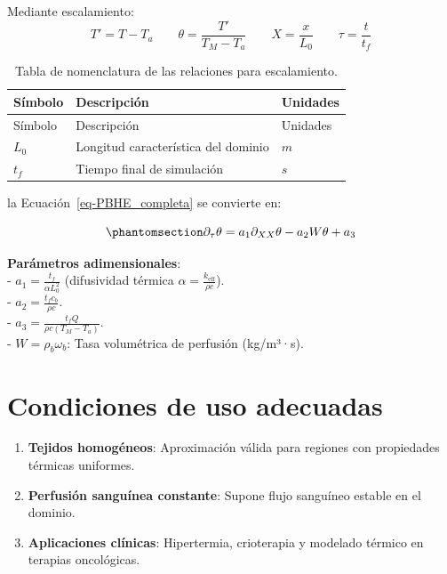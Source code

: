 \documentclass[
  spanish,
  us-letterpaper,
  DIV=11,
  numbers=noendperiod]{scrreprt}
\providecommand{\tightlist}{%
  \setlength{\itemsep}{0pt}\setlength{\parskip}{0pt}}
\theoremstyle{definition}
\theoremstyle{plain}
\theoremstyle{remark}
\begin{document}
Mediante escalamiento: \begin{equation*}
T' = T - T_a \qquad \theta = \dfrac{T'}{T_M - T_a} \qquad X = \dfrac{x}{L_0} \qquad \tau = \dfrac{t}{t_f}
\end{equation*}

\begin{longtable}[]{@{}lll@{}}
\caption{Tabla de nomenclatura de las relaciones para
escalamiento.}\label{tbl-}\tabularnewline
\toprule\noalign{}
Símbolo & Descripción & Unidades \\
\midrule\noalign{}
\endfirsthead
\toprule\noalign{}
Símbolo & Descripción & Unidades \\
\midrule\noalign{}
\endhead
\bottomrule\noalign{}
\endlastfoot
\(L_0\) & Longitud característica del dominio & \(m\) \\
\(t_f\) & Tiempo final de simulación & \(s\) \\
\end{longtable}

la Ecuación~\ref{eq-PBHE_completa} se convierte en:

\begin{equation}\phantomsection\label{eq-PBHE-reduced}{
\partial_{\tau} \theta = a_1 \partial_{XX} \theta - a_2 W \theta + a_3
}\end{equation}

\textbf{Parámetros adimensionales}:\\
- \(a_1 = \frac{t_f}{\alpha L_0^2}\) (difusividad térmica
\(\alpha = \frac{k_{\text{eff}}}{\rho c}\)).\\
- \(a_2 = \frac{t_f c_b}{\rho c}\).\\
- \(a_3 = \frac{t_f Q}{\rho c (T_M - T_a)}\).\\
- \(W = \rho_b \omega_b\): Tasa volumétrica de perfusión (kg/m³·s).

\section{Condiciones de uso
adecuadas}\label{condiciones-de-uso-adecuadas}

\begin{enumerate}
\def\labelenumi{\arabic{enumi}.}
\tightlist
\item
  \textbf{Tejidos homogéneos}: Aproximación válida para regiones con
  propiedades térmicas uniformes.\\
\item
  \textbf{Perfusión sanguínea constante}: Supone flujo sanguíneo estable
  en el dominio.\\
\item
  \textbf{Aplicaciones clínicas}: Hipertermia, crioterapia y modelado
  térmico en terapias oncológicas.
\end{enumerate}
\end{document}

